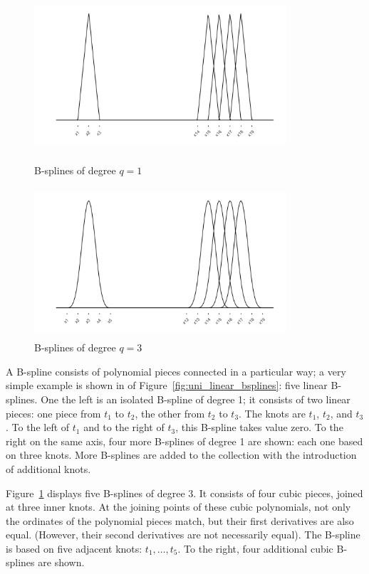 \documentclass[12pt]{article}
\begin{document}
\begin{figure}[H]
  \centering
  \graphicspath{{img/}}
  \includegraphics[width=3.7in, height=2.2in]{uni_linear_bsplines.png}
  \caption{B-splines of degree $q=1$}\label{fig:uni_linear_bsplines}
  \includegraphics[width=3.7in, height=2.2in]{uni_cubic_bsplines.png}
  \caption{B-splines of degree $q=3$}\label{fig:uni_cubic_bsplines}
\end{figure} 

A B-spline consists of polynomial pieces connected in a particular way; a very simple example is shown in of Figure~\ref{fig:uni_linear_bsplines}: five linear B-splines. One the left is an isolated B-spline of degree 1; it consists of two linear pieces: one piece from $t_1$ to $t_2$, the other from $t_2$ to $t_3$. The knots are $t_1$, $t_2$, and $t_3$. To the left of $t_1$ and to the right of $t_3$, this B-spline takes value zero. To the right on the same axis, four more B-splines of degree 1 are shown: each one based on three knots. More B-splines are added to the collection with the introduction of additional knots.

Figure~\ref{fig:uni_cubic_bsplines} displays five B-splines of degree 3. It consists of four cubic pieces, joined at three inner knots. At the joining points of these cubic polynomials, not only the ordinates of the polynomial pieces match, but their first derivatives are also equal. (However, their second derivatives are not necessarily equal). The B-spline is based on five adjacent knots: $t_1,\dots,t_5$. To the right, four additional cubic B-splines are shown.
\end{document}
